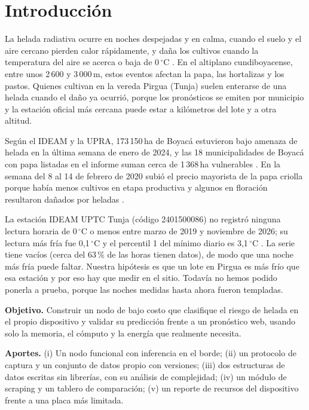 \documentclass[conference]{IEEEtran}
\begin{document}
\section{Introducci\'on}
La helada radiativa ocurre en noches despejadas y en calma, cuando el suelo y el aire cercano pierden calor r\'apidamente, y da\~na los cultivos cuando la temperatura del aire se acerca o baja de 0\,$^\circ$C \cite{fao_frost}. En el altiplano cundiboyacense, entre unos 2\,600 y 3\,000\,m, estos eventos afectan la papa, las hortalizas y los pastos. Quienes cultivan en la vereda Pirgua (Tunja) suelen enterarse de una helada cuando el da\~no ya ocurri\'o, porque los pron\'osticos se emiten por municipio y la estaci\'on oficial m\'as cercana puede estar a kil\'ometros del lote y a otra altitud.

Seg\'un el IDEAM y la UPRA, 173\,150\,ha de Boyac\'a estuvieron bajo amenaza de helada en la \'ultima semana de enero de 2024, y las 18 municipalidades de Boyac\'a con papa listadas en el informe suman cerca de 1\,368\,ha vulnerables \cite{upra2024}. En la semana del 8 al 14 de febrero de 2020 subi\'o el precio mayorista de la papa criolla porque hab\'ia menos cultivos en etapa productiva y algunos en floraci\'on resultaron da\~nados por heladas \cite{dane2020}.

La estaci\'on IDEAM UPTC Tunja (c\'odigo 2401500086) no registr\'o ninguna lectura horaria de 0\,$^\circ$C o menos entre marzo de 2019 y noviembre de 2026; su lectura m\'as fr\'ia fue 0,1\,$^\circ$C y el percentil 1 del m\'inimo diario es 3,1\,$^\circ$C \cite{ideam_data}. La serie tiene vac\'ios (cerca del 63\,\% de las horas tienen datos), de modo que una noche m\'as fr\'ia puede faltar. Nuestra hip\'otesis es que un lote en Pirgua es m\'as fr\'io que esa estaci\'on y por eso hay que medir en el sitio. Todav\'ia no hemos podido ponerla a prueba, porque las noches medidas hasta ahora fueron templadas.

\textbf{Objetivo.} Construir un nodo de bajo costo que clasifique el riesgo de helada en el propio dispositivo y validar su predicci\'on frente a un pron\'ostico web, usando solo la memoria, el c\'omputo y la energ\'ia que realmente necesita.

\textbf{Aportes.} (i) Un nodo funcional con inferencia en el borde; (ii) un protocolo de captura y un conjunto de datos propio con versiones; (iii) dos estructuras de datos escritas sin librer\'ias, con su an\'alisis de complejidad; (iv) un m\'odulo de scraping y un tablero de comparaci\'on; (v) un reporte de recursos del dispositivo frente a una placa m\'as limitada.
\end{document}

